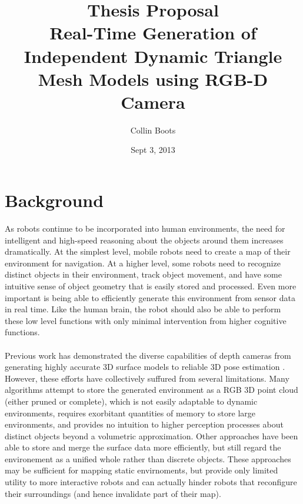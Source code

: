\documentclass[english]{article}
\title{Thesis Proposal \\ Real-Time Generation of Independent Dynamic Triangle Mesh Models using RGB-D Camera}
\author{Collin Boots}
\date{Sept 3, 2013}
\begin{document}
\maketitle
\section*{Background}
As robots continue to be incorporated into human environments, the need for intelligent and high-speed reasoning about the objects around them increases dramatically. At the simplest level, mobile robots need to create a map of their environment for navigation. At a higher level, some robots need to recognize distinct objects in their environment, track object movement, and have some intuitive sense of object geometry that is easily stored and processed. Even more important is being able to efficiently generate this environment from sensor data in real time. Like the human brain, the robot should also be able to perform these low level functions with only minimal intervention from higher cognitive functions.\\
\\
Previous work has demonstrated the diverse capabilities of depth cameras from generating highly accurate 3D surface models \cite{KinectFusion} to reliable 3D pose estimation \cite{Endres,Taguchi}. However, these efforts have collectively suffured from several limitations. Many algorithms attempt to store the generated environment as a RGB 3D point cloud (either pruned or complete), which is not easily adaptable to dynamic environments, requires exorbitant quantities of memory to store large environments, and provides no intuition to higher perception processes about distinct objects beyond a volumetric approximation. Other approaches have been able to store and merge the surface data more efficiently, but still regard the environement as a unified whole rather than discrete objects. These approaches may be sufficient for mapping static envirnoments, but provide only limited utility to more interactive robots and can actually hinder robots that reconfigure their surroundings (and hence invalidate part of their map).
\end{document}
